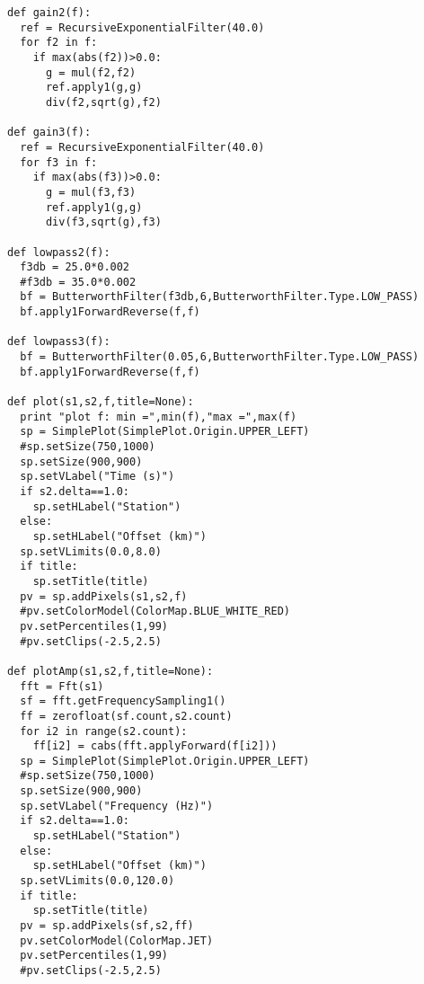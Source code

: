 \documentclass[11pt]{article}
\begin{document}
\begin{enumerate}
\begin{lstlisting}
def gain2(f):
  ref = RecursiveExponentialFilter(40.0)
  for f2 in f:
    if max(abs(f2))>0.0:
      g = mul(f2,f2)
      ref.apply1(g,g)
      div(f2,sqrt(g),f2)

def gain3(f):
  ref = RecursiveExponentialFilter(40.0)
  for f3 in f:
    if max(abs(f3))>0.0:
      g = mul(f3,f3)
      ref.apply1(g,g)
      div(f3,sqrt(g),f3)

def lowpass2(f):
  f3db = 25.0*0.002
  #f3db = 35.0*0.002
  bf = ButterworthFilter(f3db,6,ButterworthFilter.Type.LOW_PASS)
  bf.apply1ForwardReverse(f,f)

def lowpass3(f):
  bf = ButterworthFilter(0.05,6,ButterworthFilter.Type.LOW_PASS)
  bf.apply1ForwardReverse(f,f)

def plot(s1,s2,f,title=None):
  print "plot f: min =",min(f),"max =",max(f)
  sp = SimplePlot(SimplePlot.Origin.UPPER_LEFT)
  #sp.setSize(750,1000)
  sp.setSize(900,900)
  sp.setVLabel("Time (s)")
  if s2.delta==1.0:
    sp.setHLabel("Station")
  else:
    sp.setHLabel("Offset (km)")
  sp.setVLimits(0.0,8.0)
  if title:
    sp.setTitle(title)
  pv = sp.addPixels(s1,s2,f)
  #pv.setColorModel(ColorMap.BLUE_WHITE_RED)
  pv.setPercentiles(1,99)
  #pv.setClips(-2.5,2.5)

def plotAmp(s1,s2,f,title=None):
  fft = Fft(s1)
  sf = fft.getFrequencySampling1()
  ff = zerofloat(sf.count,s2.count)
  for i2 in range(s2.count):
    ff[i2] = cabs(fft.applyForward(f[i2]))
  sp = SimplePlot(SimplePlot.Origin.UPPER_LEFT)
  #sp.setSize(750,1000)
  sp.setSize(900,900)
  sp.setVLabel("Frequency (Hz)")
  if s2.delta==1.0:
    sp.setHLabel("Station")
  else:
    sp.setHLabel("Offset (km)")
  sp.setVLimits(0.0,120.0)
  if title:
    sp.setTitle(title)
  pv = sp.addPixels(sf,s2,ff)
  pv.setColorModel(ColorMap.JET)
  pv.setPercentiles(1,99)
  #pv.setClips(-2.5,2.5)


\end{lstlisting}
\end{enumerate}
\end{document}
